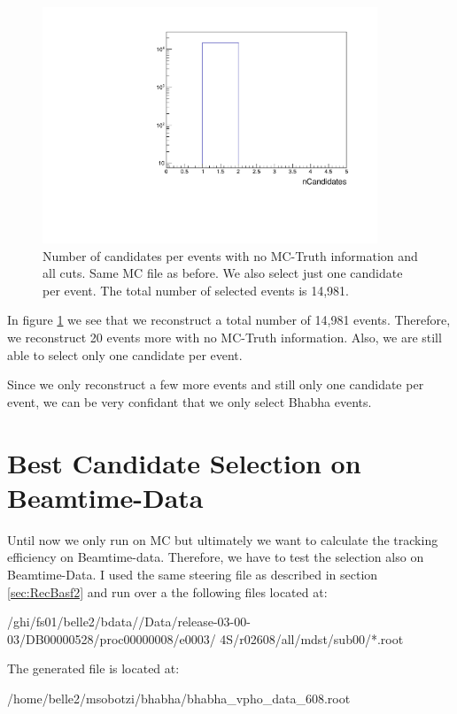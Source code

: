 \documentclass[a4paper,11pt,twosided,final,german,openbib,pdftex,listof=totoc,bibliography=totoc]{scrbook}
\begin{document}
\begin{figure}[h!]
	\centering
	\includegraphics[width=10cm]{Cuts/nCandNoMCInfo.pdf}
	\caption[Number Of Candidates Per Event With No MC-Truth Info (All Cuts)]{Number of candidates per events with no MC-Truth information and all cuts. Same MC file as before. We also select just one candidate per event. The total number of selected events is 14,981.}
	\label{fig:nCandNoMCInfo}
\end{figure}

In figure \ref{fig:nCandNoMCInfo} we see that we reconstruct a total number of 14,981 events. Therefore, we reconstruct 20 events more with no MC-Truth information. Also, we are still able to select only one candidate per event. 

Since we only reconstruct a few more events and still only one candidate per event, we can be very confidant that we only select Bhabha events.

\section{Best Candidate Selection on Beamtime-Data}
\label{sec:SelectingBhabhaData}

Until now we only run on MC but ultimately we want to calculate the tracking efficiency on Beamtime-data. Therefore, we have to test the selection also on Beamtime-Data. I used the same steering file as described in section \ref{sec:RecBasf2} and run over a the following files located at:
\newline

/ghi/fs01/belle2/bdata//Data/release-03-00-03/DB00000528/proc00000008/e0003/
4S/r02608/all/mdst/sub00/*.root
\newline

The generated file is located at:

/home/belle2/msobotzi/bhabha/bhabha\_vpho\_data\_608.root
\end{document}
